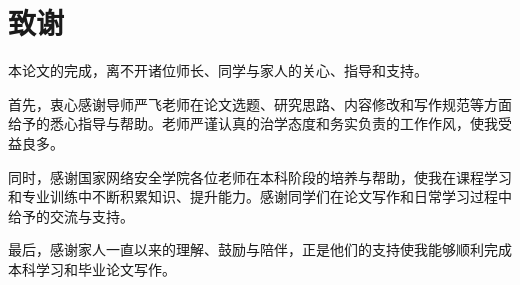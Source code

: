 
\clearpage
{}
{}

\chapter*{致谢}
本论文的完成，离不开诸位师长、同学与家人的关心、指导和支持。

首先，衷心感谢导师严飞老师在论文选题、研究思路、内容修改和写作规范等方面给予的悉心指导与帮助。老师严谨认真的治学态度和务实负责的工作作风，使我受益良多。

同时，感谢国家网络安全学院各位老师在本科阶段的培养与帮助，使我在课程学习和专业训练中不断积累知识、提升能力。感谢同学们在论文写作和日常学习过程中给予的交流与支持。

最后，感谢家人一直以来的理解、鼓励与陪伴，正是他们的支持使我能够顺利完成本科学习和毕业论文写作。
